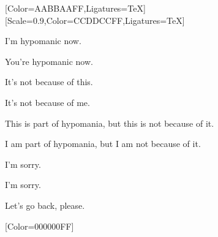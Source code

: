 \begin{paracol}{2}
\begin{leftcolumn}
  [Color=AABBAAFF,Ligatures=TeX]
  \renewfontfamily{}[Scale=0.9,Color=CCDDCCFF,Ligatures=TeX]

\null
\vfill

\noindent I'm hypomanic now.

\begin{ally}
You're hypomanic now.
\end{ally}
It's not because of this.

\begin{ally}
It's not because of me.
\end{ally}
This is part of hypomania, but this is not because of it.

\begin{ally}
I am part of hypomania, but I am not because of it.
\end{ally}
I'm sorry.

\begin{ally}
I'm sorry.
\end{ally}
Let's go back, please.
\newpage

\end{leftcolumn}
\end{paracol}
\resetbackgroundcolor
\renewfontfamily{}[Color=000000FF]
